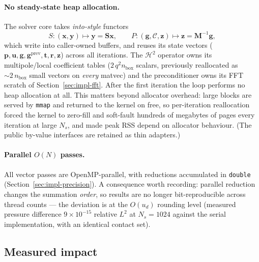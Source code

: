 \documentclass[11pt,a4paper]{article}
\newcommand{\bS}{\mathbf{S}}
\newcommand{\bp}{\mathbf{p}}
\newcommand{\bg}{\mathbf{g}}
\newcommand{\br}{\mathbf{r}}
\newcommand{\bt}{\mathbf{t}}
\newcommand{\bu}{\mathbf{u}}
\newcommand{\bx}{\mathbf{x}}
\newcommand{\by}{\mathbf{y}}
\newcommand{\bz}{\mathbf{z}}
\newcommand{\bM}{\mathbf{M}}
\newcommand{\calC}{\mathcal{C}}
\begin{document}
\paragraph{No steady-state heap allocation.}
The solver core takes \emph{into-style} functors
\[
  S : (\bx, \by) \mapsto \by = \bS\bx, \qquad
  P : (\bg, \calC, \bz) \mapsto \bz = \bM^{-1}\bg,
\]
which write into caller-owned buffers, and reuses its state vectors
($\bp, \bu, \bg, \bg^{\mathrm{prev}}, \bt, \br, \bz$) across all iterations.
The $\mathcal H^2$ operator owns its multipole/local coefficient tables
($2\,q^2 n_{\mathrm{box}}$ scalars, previously reallocated as
$\sim\!2\,n_{\mathrm{box}}$ small vectors on \emph{every} matvec) and the
preconditioner owns its FFT scratch of Section~\ref{sec:impl-fft}.  After the
first iteration the loop performs no heap allocation at all.  This matters
beyond allocator overhead: large blocks are served by \texttt{mmap} and
returned to the kernel on free, so per-iteration reallocation forced the
kernel to zero-fill and soft-fault hundreds of megabytes of pages every
iteration at large $N_s$, and made peak RSS depend on allocator behaviour.
(The public by-value interfaces are retained as thin adapters.)

\paragraph{Parallel $O(N)$ passes.}
All vector passes are OpenMP-parallel, with reductions accumulated in
\texttt{double} (Section~\ref{sec:impl-precision}).  A consequence worth
recording: parallel reduction changes the summation \emph{order}, so results
are no longer bit-reproducible across thread counts --- the deviation is at
the $O(u_d)$ rounding level (measured pressure difference $9\times10^{-15}$
relative $L^2$ at $N_s = 1024$ against the serial implementation, with an
identical contact set).

\subsection{Measured impact}
\end{document}
